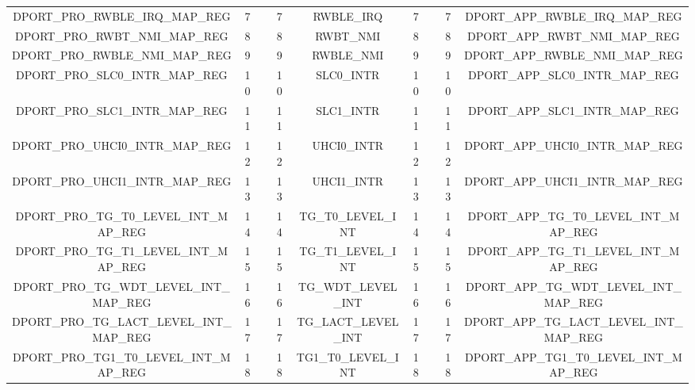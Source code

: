 \begin{landscape}
\begin{tiny}
\begin{longtable}[c]{|*{10}{c|}}
      \cline{1-2} \cline{4-7} \cline{9-10} DPORT\_PRO\_RWBLE\_IRQ\_MAP\_REG  & 7& &7 & \multicolumn{2}{c|}{ RWBLE\_IRQ} &7 &  &7& DPORT\_APP\_RWBLE\_IRQ\_MAP\_REG\\
      \cline{1-2} \cline{4-7} \cline{9-10}
    DPORT\_PRO\_RWBT\_NMI\_MAP\_REG  & 8& &8 & \multicolumn{2}{c|}{ RWBT\_NMI} &8 &  &8& DPORT\_APP\_RWBT\_NMI\_MAP\_REG\\
      \cline{1-2} \cline{4-7} \cline{9-10}
     DPORT\_PRO\_RWBLE\_NMI\_MAP\_REG  & 9& &9 & \multicolumn{2}{c|}{RWBLE\_NMI} &9 &  &9& DPORT\_APP\_RWBLE\_NMI\_MAP\_REG\\
      \cline{1-2} \cline{4-7} \cline{9-10}
     DPORT\_PRO\_SLC0\_INTR\_MAP\_REG  & 10& &10 & \multicolumn{2}{c|}{SLC0\_INTR} &10 &  &10& DPORT\_APP\_SLC0\_INTR\_MAP\_REG\\
      \cline{1-2} \cline{4-7} \cline{9-10} DPORT\_PRO\_SLC1\_INTR\_MAP\_REG & 11& &11 & \multicolumn{2}{c|}{ SLC1\_INTR} &11 &  &11& DPORT\_APP\_SLC1\_INTR\_MAP\_REG\\
      \cline{1-2} \cline{4-7} \cline{9-10}
     DPORT\_PRO\_UHCI0\_INTR\_MAP\_REG & 12& &12 & \multicolumn{2}{c|}{ UHCI0\_INTR } &12 &  &12& DPORT\_APP\_UHCI0\_INTR\_MAP\_REG\\
      \cline{1-2} \cline{4-7} \cline{9-10}
       DPORT\_PRO\_UHCI1\_INTR\_MAP\_REG & 13& &13 & \multicolumn{2}{c|}{UHCI1\_INTR} &13 &  &13& DPORT\_APP\_UHCI1\_INTR\_MAP\_REG\\
      \cline{1-2} \cline{4-7} \cline{9-10}
     DPORT\_PRO\_TG\_T0\_LEVEL\_INT\_MAP\_REG & 14& &14 & \multicolumn{2}{c|}{TG\_T0\_LEVEL\_INT} &14 &  &14& DPORT\_APP\_TG\_T0\_LEVEL\_INT\_MAP\_REG\\
      \cline{1-2} \cline{4-7} \cline{9-10} DPORT\_PRO\_TG\_T1\_LEVEL\_INT\_MAP\_REG & 15& &15 & \multicolumn{2}{c|}{ TG\_T1\_LEVEL\_INT} &15& &15& DPORT\_APP\_TG\_T1\_LEVEL\_INT\_MAP\_REG\\
      \cline{1-2} \cline{4-7} \cline{9-10}
     DPORT\_PRO\_TG\_WDT\_LEVEL\_INT\_MAP\_REG & 16& &16 & \multicolumn{2}{c|}{TG\_WDT\_LEVEL\_INT} &16& & 16&DPORT\_APP\_TG\_WDT\_LEVEL\_INT\_MAP\_REG\\
      \cline{1-2} \cline{4-7} \cline{9-10}
    DPORT\_PRO\_TG\_LACT\_LEVEL\_INT\_MAP\_REG & 17& &17 & \multicolumn{2}{c|}{TG\_LACT\_LEVEL\_INT } &17 &  &17& DPORT\_APP\_TG\_LACT\_LEVEL\_INT\_MAP\_REG\\
      \cline{1-2} \cline{4-7} \cline{9-10}
       DPORT\_PRO\_TG1\_T0\_LEVEL\_INT\_MAP\_REG & 18& &18 & \multicolumn{2}{c|}{TG1\_T0\_LEVEL\_INT} &18 &  &18& DPORT\_APP\_TG1\_T0\_LEVEL\_INT\_MAP\_REG\\

\end{longtable}
\end{tiny}
\end{landscape}
